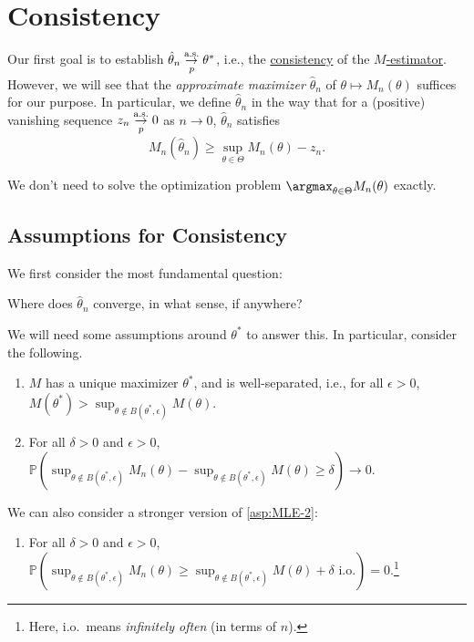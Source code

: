 \section{Consistency}
Our first goal is to establish \(\hat{\theta} _n \overunderset{\text{a.s.}}{p}{\to } \theta ^{\ast} \), i.e., the \hyperref[def:consistent]{consistency} of the \hyperref[def:M-estimator]{\(M\)-estimator}. However, we will see that the \emph{approximate maximizer} \(\hat{\theta} _n\) of \(\theta \mapsto M_n(\theta )\) suffices for our purpose. In particular, we define \(\hat{\theta} _n\) in the way that for a (positive) vanishing sequence \(z_n \overunderset{\text{a.s.}}{p}{\to } 0\) as \(n \to 0\), \(\hat{\theta} _n\) satisfies
\begin{equation}\label{eq:approximate-M-estimator}
	M_n(\hat{\theta} _n)
	\geq \sup _{\theta \in \Theta } M_n(\theta ) - z_n.
\end{equation}

\begin{intuition}
	We don't need to solve the optimization problem \(\argmax_{\theta \in \Theta } M_n(\theta )\) exactly.
\end{intuition}

\subsection{Assumptions for Consistency}
We first consider the most fundamental question:

\begin{problem*}
	Where does \(\hat{\theta} _n\) converge, in what sense, if anywhere?
\end{problem*}

We will need some assumptions around \(\theta ^{\ast} \) to answer this. In particular, consider the following.

\begin{enumerate}[label=(A\arabic*)]
	\item\label{asp:MLE-1} \(M\) has a unique maximizer \(\theta ^{\ast} \), and is well-separated, i.e., for all \(\epsilon > 0\), \(M(\theta ^{\ast} ) > \sup _{\theta \notin B(\theta ^{\ast} , \epsilon )} M(\theta )\).
	\item\label{asp:MLE-2} For all \(\delta > 0\) and \(\epsilon > 0\), \(\mathbb{P} ( \sup _{\theta \notin B(\theta ^{\ast} , \epsilon )} M_n(\theta ) - \sup _{\theta \notin B(\theta ^{\ast} , \epsilon )} M(\theta ) \geq \delta ) \to 0\).
\end{enumerate}
We can also consider a stronger version of \autoref{asp:MLE-2}:
\begin{enumerate}[resume, label=(A\arabic*)]
	\item\label{asp:MLE-3} For all \(\delta > 0\) and \(\epsilon > 0\), \(\mathbb{P} ( \sup _{\theta \notin B(\theta ^{\ast} , \epsilon )} M_n(\theta ) \geq \sup _{\theta \notin B(\theta ^{\ast} , \epsilon )} M(\theta ) + \delta \text{ i.o.} ) = 0\).\footnote{Here, i.o.\ means \emph{infinitely often} (in terms of \(n\)).}
\end{enumerate}

